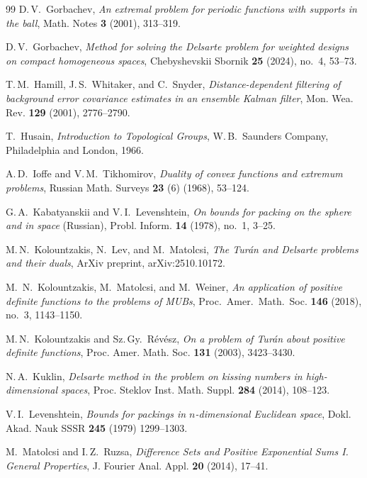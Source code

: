 \documentclass[[a4paper,english,12pt]{amsart}
\theoremstyle{plain}
\theoremstyle{remark}
\begin{document}
\begin{thebibliography}{99}
D.\,V.~Gorbachev,
\emph{An extremal problem for periodic functions with supports in the ball},
Math. Notes \textbf{3} (2001), 313--319.

D.\,V.~Gorbachev, \emph{Method for solving the Delsarte problem for weighted designs on compact homogeneous spaces}, Chebyshevskii Sbornik \textbf{25} (2024), no.~4, 53--73.

T.\,M.~Hamill, J.\,S.~Whitaker, and C.~Snyder, \emph{Distance-dependent filtering of background error covariance estimates in an ensemble Kalman filter}, Mon. Wea. Rev. \textbf{129} (2001), 2776--2790.

T.~Husain, \emph{Introduction to Topological Groups}, W.\,B.~Saunders Company, Philadelphia and London, 1966.

A.\,D.~Ioffe and V.\,M.~Tikhomirov, \emph{Duality of convex functions and extremum problems},
Russian Math. Surveys \textbf{23} (6) (1968), 53--124.

G.\,A.~Kabatyanskii and V.\,I.~Levenshtein, 
\emph{On bounds for packing on the sphere and in space} (Russian), Probl. Inform. \textbf{14} (1978), no.~1, 3--25.

M.\,N.~Kolountzakis, N.~Lev, and M.~Matolcsi, \emph{The Tur\'an and Delsarte problems and their duals}, ArXiv preprint,  arXiv:2510.10172.

M.~N.~Kolountzakis, M.~Matolcsi, and M.~Weiner,
\emph{An application of positive definite functions to the problems of MUBs},
Proc.\ Amer.\ Math.\ Soc. \textbf{146} (2018), no.~3, 1143--1150.

M.\,N.~Kolountzakis and Sz.\,Gy.~R\'ev\'esz,
\emph{On a problem of Tur\'an about positive definite functions},
Proc. Amer. Math. Soc. \textbf{131} (2003), 3423--3430.

N.\,A.~Kuklin,
\emph{Delsarte method in the problem on kissing numbers in high-dimensional spaces},
Proc. Steklov Inst. Math. Suppl. \textbf{284} (2014), 108--123.

V.\,I.~Levenshtein, \emph{Bounds for packings in $n$-dimensional Euclidean space},
Dokl. Akad. Nauk SSSR \textbf{245} (1979) 1299--1303.

M.~Matolcsi and I.\,Z.~Ruzsa, \emph{Difference Sets and Positive Exponential Sums I. General Properties},
J. Fourier Anal. Appl. \textbf{20} (2014), 17--41.


\end{thebibliography}
\end{document}
